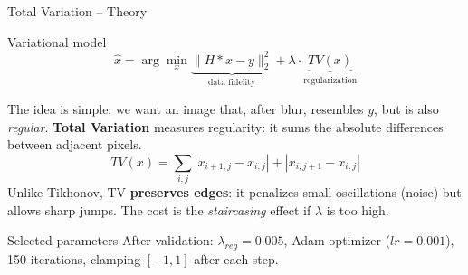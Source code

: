 \documentclass[english,10pt]{beamer}
\begin{document}
\begin{frame}{Total Variation -- Theory}
  \begin{block}{Variational model}
    \begin{equation*}
      \hat{x} = \arg\min_x \underbrace{\|H*x - y\|_2^2}_{\text{data fidelity}} + \lambda \cdot \underbrace{TV(x)}_{\text{regularization}}
    \end{equation*}
  \end{block}
  \vspace{0.15cm}
  \noindent The idea is simple: we want an image that, after blur, resembles $y$, but is also \emph{regular}. \textbf{Total Variation} measures regularity: it sums the absolute differences between adjacent pixels.
  \begin{equation*}
    TV(x) = \sum_{i,j} |x_{i+1,j} - x_{i,j}| + |x_{i,j+1} - x_{i,j}|
  \end{equation*}
  \noindent Unlike Tikhonov, TV \textbf{preserves edges}: it penalizes small oscillations (noise) but allows sharp jumps. The cost is the \textit{staircasing} effect if $\lambda$ is too high.
  \vspace{0.15cm}
  \begin{block}{Selected parameters}
    After validation: $\lambda_{reg}=0.005$, Adam optimizer ($lr=0.001$), 150 iterations, clamping $[-1,1]$ after each step.
  \end{block}
\end{frame}
\end{document}
